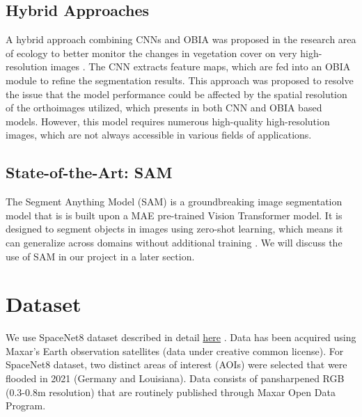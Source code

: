\documentclass[10pt,twocolumn,letterpaper]{article}
\begin{document}
\subsection{Hybrid Approaches}


 A hybrid approach combining CNNs and OBIA was proposed in the research area of ecology to better monitor the changes in vegetation cover on very high-resolution images \cite{guirado2021mask}. The CNN extracts feature maps, which are fed into an OBIA module to refine the segmentation results. This approach was proposed to resolve the issue that the model performance could be affected by the spatial resolution of the orthoimages utilized, which presents in both CNN and OBIA based models. However, this model requires numerous high-quality high-resolution images, which are not always accessible in various fields of applications. 

\subsection{State-of-the-Art: SAM}

The Segment Anything Model (SAM) is a groundbreaking image segmentation model that is is built upon a MAE pre-trained Vision Transformer model. It is designed to segment objects in images using zero-shot learning, which means it can generalize across domains without additional training \cite{Kirillov2023SegmentA}. We will discuss the use of SAM in our project in a later section. 





\section{Dataset}
\label{sec:dataset}

We use SpaceNet8 dataset described in detail \href{https://openaccess.thecvf.com/content/CVPR2022W/EarthVision/papers/Hansch_SpaceNet_8_-_The_Detection_of_Flooded_Roads_and_Buildings_CVPRW_2022_paper.pdf}{here} \cite{spacenet8}. Data has been acquired using Maxar’s Earth observation satellites (data under creative common license). For SpaceNet8 dataset, two distinct areas of interest (AOIs) were selected that were flooded in 2021 (Germany and Louisiana). Data consists of pansharpened RGB (0.3-0.8m resolution) that are routinely published through Maxar Open Data Program.
\end{document}
